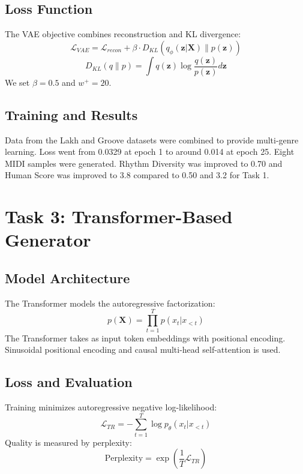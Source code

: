\documentclass[conference]{IEEEtran}
\begin{document}
\subsection{Loss Function}

The VAE objective combines reconstruction and KL divergence:
\begin{equation}
\mathcal{L}_{VAE} = \mathcal{L}_{recon} + \beta \cdot D_{KL}(q_\phi(\mathbf{z}|\mathbf{X}) \| p(\mathbf{z}))
\end{equation}
\begin{equation}
D_{KL}(q \| p) = \int q(\mathbf{z}) \log \frac{q(\mathbf{z})}{p(\mathbf{z})} d\mathbf{z}
\end{equation}
We set $\beta = 0.5$ and $w^+ = 20$.

\subsection{Training and Results}

Data from the Lakh and Groove datasets were combined to provide multi-genre learning. Loss went from 0.0329 at epoch 1 to around 0.014 at epoch 25. Eight MIDI samples were generated. Rhythm Diversity was improved to 0.70 and Human Score was improved to 3.8 compared to 0.50 and 3.2 for Task 1.

\section{Task 3: Transformer-Based Generator}

\subsection{Model Architecture}

The Transformer models the autoregressive factorization:
\begin{equation}
p(\mathbf{X}) = \prod_{t=1}^{T} p(x_t | x_{<t})
\end{equation}
The Transformer takes as input token embeddings with positional encoding. Sinusoidal positional encoding and causal multi-head self-attention is used.

\subsection{Loss and Evaluation}

Training minimizes autoregressive negative log-likelihood:
\begin{equation}
\mathcal{L}_{TR} = -\sum_{t=1}^{T} \log p_\theta(x_t | x_{<t})
\end{equation}
Quality is measured by perplexity:
\begin{equation}
\text{Perplexity} = \exp\!\left(\frac{1}{T} \mathcal{L}_{TR}\right)
\end{equation}
\end{document}
